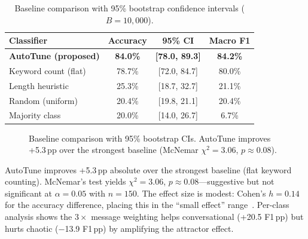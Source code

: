 \documentclass[11pt]{article}
\begin{document}
\begin{table}[t]
\caption{Baseline comparison with 95\% bootstrap confidence intervals ($B=10{,}000$).}
\label{tab:baselines}
\centering
\small
\begin{tabular}{@{}lccc@{}}
\toprule
Classifier & Accuracy & 95\% CI & Macro F1 \\
\midrule
\textbf{AutoTune (proposed)} & \textbf{84.0\%} & \textbf{[78.0, 89.3]} & \textbf{84.2\%} \\
Keyword count (flat) & 78.7\% & [72.0, 84.7] & 80.0\% \\
Length heuristic & 25.3\% & [18.7, 32.7] & 21.1\% \\
Random (uniform) & 20.4\% & [19.8, 21.1] & 20.4\% \\
Majority class & 20.0\% & [14.0, 26.7] & 6.7\% \\
\bottomrule
\end{tabular}
\end{table}

\begin{figure}[t]
\centering
{}
\caption{Baseline comparison with 95\% bootstrap CIs. AutoTune improves +5.3\,pp over the strongest baseline (McNemar $\chi^2 = 3.06$, $p \approx 0.08$).}
\label{fig:baselines}
\end{figure}

AutoTune improves +5.3\,pp absolute over the strongest baseline (flat keyword counting). McNemar's test yields $\chi^2 = 3.06$, $p \approx 0.08$---suggestive but not significant at $\alpha = 0.05$ with $n=150$. The effect size is modest: Cohen's $h = 0.14$ for the accuracy difference, placing this in the ``small effect'' range~\cite{cohen1988statistical}. Per-class analysis shows the $3\times$ message weighting helps conversational (+20.5 F1\,pp) but hurts chaotic ($-$13.9 F1\,pp) by amplifying the attractor effect.
\end{document}
